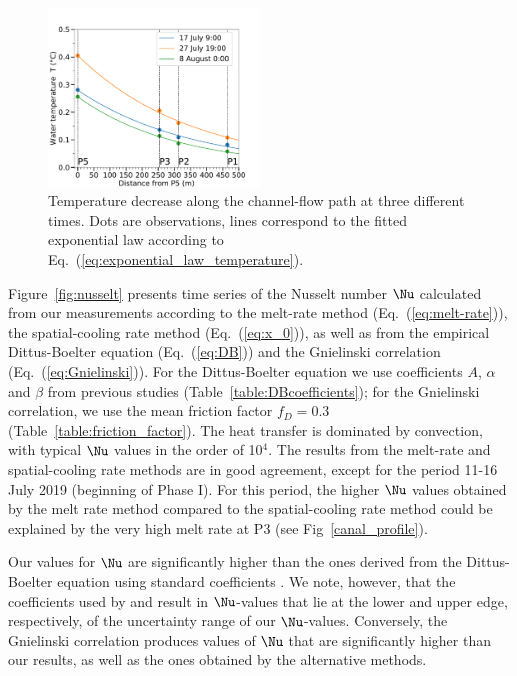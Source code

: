 \begin{figure}[H]
    \centering
    \includegraphics[width=0.5\textwidth]{chapters/chapter_plainemorte/fig07.pdf}
    \caption{Temperature decrease along the channel-flow path at three different times. Dots are observations, lines correspond to the fitted exponential law according to Eq.~(\ref{eq:exponential_law_temperature}).}
    \label{fig:exponential_temperature_decrease}
\end{figure}

Figure~\ref{fig:nusselt} presents time series of the Nusselt number $\Nu$ calculated from our measurements according to the melt-rate method (Eq.~(\ref{eq:melt-rate})), the spatial-cooling rate method (Eq.~(\ref{eq:x_0})), as well as from the empirical Dittus-Boelter equation (Eq.~(\ref{eq:DB})) and the Gnielinski correlation (Eq.~(\ref{eq:Gnielinski})). For the Dittus-Boelter equation we use coefficients $A$, $\alpha$ and $\beta$ from previous studies (Table~\ref{table:DBcoefficients}); for the Gnielinski correlation, we use the mean friction factor $f_D = 0.3$ (Table~\ref{table:friction_factor}). The heat transfer is dominated by convection, with typical $\Nu$ values in the order of 10$^4$. The results from the melt-rate and spatial-cooling rate methods are in good agreement, except for the period 11-16 July 2019 (beginning of Phase I). For this period, the higher $\Nu$ values obtained by the melt rate method compared to the spatial-cooling rate method could be explained by the very high melt rate at P3 (see Fig~\ref{canal_profile}).

Our values for $\Nu$ are significantly higher than the ones derived from the Dittus-Boelter equation using standard coefficients \cite[e.g.][]{Clarke2003}. We note, however, that the coefficients used by \cite{Lunardini&al1986} and \cite{Vincent&al2010} result in $\Nu$-values that lie at the lower and upper edge, respectively, of the uncertainty range of our $\Nu$-values. Conversely, the Gnielinski correlation produces values of $\Nu$ that are significantly higher than our results, as well as the ones obtained by the alternative methods.


